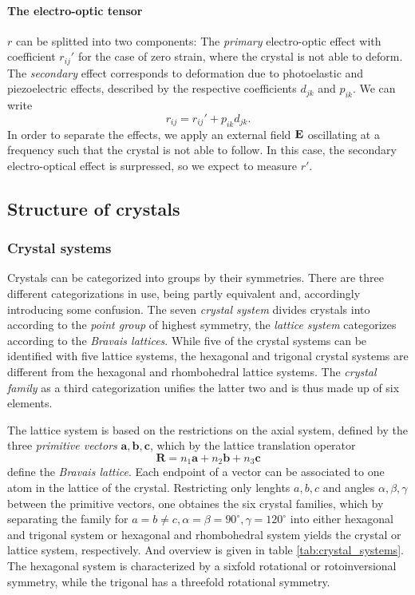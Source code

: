 \paragraph{The electro-optic tensor}
$r$ can be splitted into two components:
The \emph{primary} electro-optic effect with coefficient $r_{ij}'$
for the case of zero strain, where the crystal is 
not able to deform. The \emph{secondary} effect corresponds to deformation 
due to photoelastic and piezoelectric effects, described by the 
respective coefficients $d_{jk}$ and $p_{ik}$.
We can write
\begin{equation}
    r_{ij} = r_{ij}' + p_{ik} d_{jk}.
\end{equation}
In order to separate the effects, we apply an external field $\mathbf{E}$ 
oscillating at a frequency such that the crystal is not able 
to follow. In this case, the secondary electro-optical effect is surpressed, 
so we expect to measure $r'$. 

\subsection{Structure of crystals}
\subsubsection{Crystal systems}
Crystals can be categorized into groups by their symmetries. 
There are three different categorizations in use, being 
partly equivalent and, accordingly introducing some confusion. 
The seven \emph{crystal system} divides crystals into 
according to the \emph{point group} of highest symmetry, 
the \emph{lattice system} 
categorizes according to the \emph{Bravais lattices}. While 
five of the crystal systems can be identified with five 
lattice systems, the hexagonal and trigonal crystal systems 
are different from the hexagonal and rhombohedral lattice systems. 
The \emph{crystal family} as a third categorization unifies 
the latter two and is thus made up of six elements. 

The lattice system is based on the restrictions on the axial 
system, defined by the three 
\emph{primitive vectors} $\mathbf{a, b, c}$, which 
by the lattice translation operator 
\begin{equation}
    \mathbf{R} = n_1 \mathbf{a} + n_2 \mathbf{b} + n_3 \mathbf{c}
\end{equation}
define the \emph{Bravais lattice}. Each endpoint of a vector 
can be associated to one atom in the lattice of the crystal. 
Restricting only lenghts $a, b, c$ and angles $\alpha, \beta, \gamma$ 
between the primitive vectors, 
one obtaines the six crystal families, which by separating the 
family for $a = b \neq c, \alpha = \beta = 90^\circ, \gamma = 120^\circ$ 
into either hexagonal and trigonal system 
or hexagonal and rhombohedral system yields the crystal or lattice 
system, respectively. And overview is given in table 
\ref{tab:crystal_systems}. The hexagonal system is characterized by 
a sixfold rotational or rotoinversional symmetry, while the 
trigonal has a threefold rotational symmetry. 

